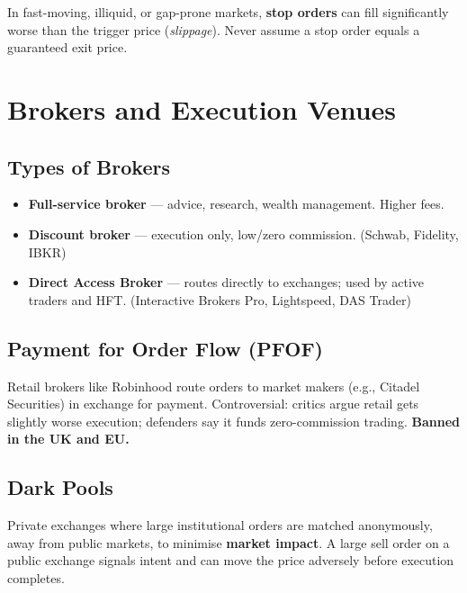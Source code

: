 \begin{warningbox}
In fast-moving, illiquid, or gap-prone markets, \textbf{stop orders} can fill significantly
worse than the trigger price (\emph{slippage}). Never assume a stop order equals a
guaranteed exit price.
\end{warningbox}

\section{Brokers and Execution Venues}

\subsection{Types of Brokers}
\begin{itemize}
  \item \textbf{Full-service broker} — advice, research, wealth management. Higher fees.
  \item \textbf{Discount broker} — execution only, low/zero commission. (Schwab, Fidelity, IBKR)
  \item \textbf{Direct Access Broker} — routes directly to exchanges; used by active traders and HFT.
        (Interactive Brokers Pro, Lightspeed, DAS Trader)
\end{itemize}

\subsection{Payment for Order Flow (PFOF)}
Retail brokers like Robinhood route orders to market makers (e.g., Citadel Securities) in
exchange for payment. Controversial: critics argue retail gets slightly worse execution;
defenders say it funds zero-commission trading. \textbf{Banned in the UK and EU.}

\subsection{Dark Pools}
Private exchanges where large institutional orders are matched anonymously, away from public
markets, to minimise \textbf{market impact}. A large sell order on a public exchange signals
intent and can move the price adversely before execution completes.

